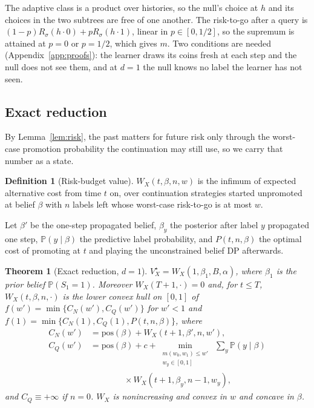 \documentclass{article}
\theoremstyle{plain}
\newtheorem{theorem}{Theorem}
\theoremstyle{definition}
\newtheorem{definition}{Definition}
\theoremstyle{remark}
\newcommand{\PP}{\mathbb{P}}
\newcommand{\pos}{\mathrm{pos}}
\begin{document}
The adaptive class is a product over histories, so the null's choice at $h$ and its choices in the two subtrees are free of one another. The risk-to-go after a query is $(1-p)R_\sigma(h\cdot 0)+pR_\sigma(h\cdot 1)$, linear in $p\in[0,1/2]$, so the supremum is attained at $p=0$ or $p=1/2$, which gives $m$. Two conditions are needed (Appendix~\ref{app:proofs}): the learner draws its coins fresh at each step and the null does not see them, and at $d=1$ the null knows no label the learner has not seen.

\subsection{Exact reduction}

By Lemma~\ref{lem:risk}, the past matters for future risk only through the worst-case promotion probability the continuation may still use, so we carry that number as a state.

\begin{definition}[Risk-budget value]
$W_X(t,\beta,n,w)$ is the infimum of expected alternative cost from time $t$ on, over continuation strategies started unpromoted at belief $\beta$ with $n$ labels left whose worst-case risk-to-go is at most $w$.
\end{definition}

Let $\beta'$ be the one-step propagated belief, $\beta_y$ the posterior after label $y$ propagated one step, $\PP(y\mid\beta)$ the predictive label probability, and $P(t,n,\beta)$ the optimal cost of promoting at $t$ and playing the unconstrained belief DP afterwards.

\begin{theorem}[Exact reduction, $d=1$]
\label{thm:reduction}
$V^\star_X=W_X(1,\beta_1,B,\alpha)$, where $\beta_1$ is the prior belief $\PP(S_1=1)$. Moreover $W_X(T+1,\cdot)=0$ and, for $t\le T$, $W_X(t,\beta,n,\cdot)$ is the lower convex hull on $[0,1]$ of $f(w')=\min\{C_N(w'),C_Q(w')\}$ for $w'<1$ and $f(1)=\min\{C_N(1),C_Q(1),P(t,n,\beta)\}$, where
\begin{align*}
C_N(w')&=\pos(\beta)+W_X(t+1,\beta',n,w'),\\
C_Q(w')&=\pos(\beta)+c+\min_{\substack{m(w_0,w_1)\le w'\\ w_y\in[0,1]}}\ \textstyle\sum_{y}\PP(y\mid\beta)\\
&\qquad\qquad\times W_X(t+1,\beta_y,n-1,w_y),
\end{align*}
and $C_Q\equiv+\infty$ if $n=0$. $W_X$ is nonincreasing and convex in $w$ and concave in $\beta$.
\end{theorem}
\end{document}
